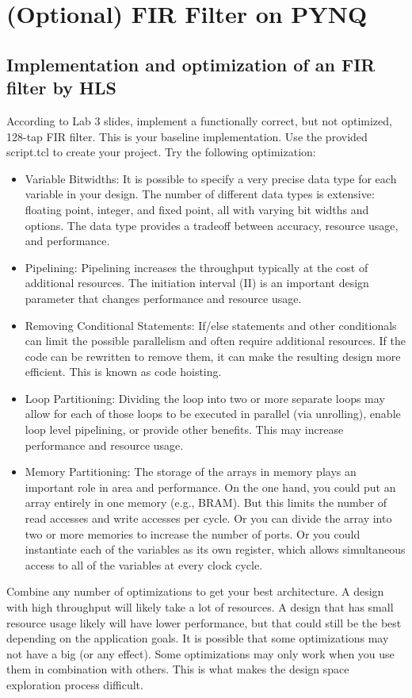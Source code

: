 \documentclass[a4paper,12pt,twoside]{article}
\begin{document}
\section{(Optional) FIR Filter on PYNQ}\label{Sopt2}
\subsection{Implementation and optimization of an FIR filter by HLS}
According to Lab 3 slides, implement a functionally correct, but not optimized, 128-tap FIR filter. This is your baseline implementation. Use the provided script.tcl to create your project. Try the following optimization:
\begin{itemize}
    \item Variable Bitwidths: It is possible to specify a very precise data type for each variable in your design. The number of different data types is extensive: floating point, integer, and fixed point, all with varying bit widths and options. The data type provides a tradeoff between accuracy, resource usage, and performance.
    \item Pipelining: Pipelining increases the throughput typically at the cost of additional resources. The initiation interval (II) is an important design parameter that changes performance and resource usage.
    \item Removing Conditional Statements: If/else statements and other conditionals can limit the possible parallelism and often require additional resources. If the code can be rewritten to remove them, it can make the resulting design more efficient. This is known as code hoisting.
    \item Loop Partitioning: Dividing the loop into two or more separate loops may allow for each of those loops to be executed in parallel (via unrolling), enable loop level pipelining, or provide other benefits. This may increase performance and resource usage.
    \item Memory Partitioning: The storage of the arrays in memory plays an important role in area and performance. On the one hand, you could put an array entirely in one memory (e.g., BRAM). But this limits the number of read accesses and write accesses per cycle. Or you can divide the array into two or more memories to increase the number of ports. Or you could instantiate each of the variables as its own register, which allows simultaneous access to all of the variables at every clock cycle.
\end{itemize}
Combine any number of optimizations to get your best architecture. A design with high throughput will likely take a lot of resources. A design that has small resource usage likely will have lower performance, but that could still be the best depending on the application goals. It is possible that some optimizations may not have a big (or any effect). Some optimizations may only work when you use them in combination with others. This is what makes the design space exploration process difficult.
\end{document}
